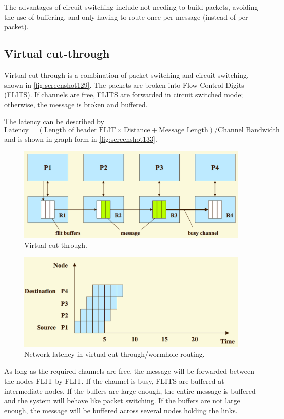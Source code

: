 The advantages of circuit switching include not needing to build packets, avoiding the use of buffering, and only having to route once per message (instead of per packet).

\subsection{Virtual cut-through}
Virtual cut-through is a combination of packet switching and circuit switching, shown in \autoref{fig:screenshot129}. The packets are broken into Flow Control Digits (FLITS). If channels are free, FLITS are forwarded in circuit switched mode; otherwise, the message is broken and buffered.

The latency can be described by
\[ \text{Latency} =  (\text{Length of header FLIT} \times \text{Distance} + \text{Message Length})/\text{Channel Bandwidth} \]
and is shown in graph form in \autoref{fig:screenshot133}.

\begin{figure}
\centering
\includegraphics[width=0.7\linewidth]{screenshot129}
\caption{Virtual cut-through.}
\label{fig:screenshot129}
\end{figure}

\begin{figure}
\centering
\includegraphics[width=0.7\linewidth]{screenshot133}
\caption{Network latency in virtual cut-through/wormhole routing.}
\label{fig:screenshot133}
\end{figure}


As long as the required channels are free, the message will be forwarded between the nodes FLIT-by-FLIT. If the channel is busy, FLITS are buffered at intermediate nodes. If the buffers are large enough, the entire message is buffered and the system will behave like packet switching. If the buffers are not large enough, the message will be buffered across several nodes holding the links.


